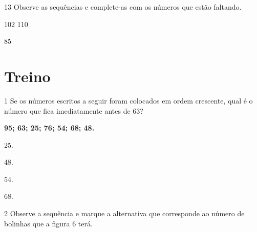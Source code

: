 \num{13} Observe as sequências e complete-as com os números que estão faltando.

\begin{escolha}
\item 102 \quad {} \quad {} 110 \quad {}

\item 85 \quad {} \quad {}   \quad {}
\end{escolha}


\pagebreak

\section*{Treino}

\num{1} Se os números escritos a seguir foram colocados em ordem crescente, qual
é o número que fica imediatamente antes de 63?

\begin{myquote}
\centering
\textbf{95; 63; 25; 76; 54; 68; 48.}
\end{myquote}

\begin{escolha}
\begin{multicols}{2}
\item 25.

\item 48.
\end{multicols}


\begin{multicols}{2}
\item 54.

\item 68.
\end{multicols}
\end{escolha}

\num{2} Observe a sequência e marque a alternativa que corresponde ao número de bolinhas que a figura 6 terá.

\vspace{1em}



